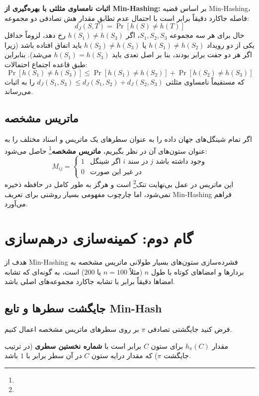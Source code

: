 \textbf{اثبات نامساوی مثلثی با بهره‌گیری از Min-Hashing:}
بر اساس قضیه Min-Hashing، فاصله جاکارد دقیقاً برابر است با احتمال عدم تطابق مقدار هش تصادفی دو مجموعه:
\begin{equation}
d_J(S, T) = \Pr[h(S) \ne h(T)]
\end{equation}
حال برای هر سه مجموعه $S_1, S_2, S_3$، اگر $h(S_1) \ne h(S_3)$ رخ دهد، لزوماً حداقل یکی از دو رویداد $h(S_1) \ne h(S_2)$ یا $h(S_2) \ne h(S_3)$ باید اتفاق افتاده باشد (زیرا اگر هر دو جفت برابر بودند، بنا بر اصل تعدی باید $h(S_1) = h(S_3)$ می‌شد). بنابراین طبق قاعده اجتماع احتمالات:
\begin{equation}
\Pr[h(S_1) \ne h(S_3)] \le \Pr[h(S_1) \ne h(S_2)] + \Pr[h(S_2) \ne h(S_3)]
\end{equation}
که مستقیماً نامساوی مثلثی $d_J(S_1, S_3) \le d_J(S_1, S_2) + d_J(S_2, S_3)$ را به اثبات می‌رساند.

\subsection{ماتریس مشخصه \texorpdfstring{}{(Characteristic Matrix)}}
اگر تمام شینگل‌های جهان داده را به عنوان سطرهای یک ماتریس و اسناد مختلف را به عنوان ستون‌های آن در نظر بگیریم، \textbf{ماتریس مشخصه}\footnote{} حاصل می‌شود:
\begin{equation}
M_{ij} = 
\begin{cases}
1 & \text{اگر شینگل } i \text{ در سند } j \text{ وجود داشته باشد} \\
0 & \text{در غیر این صورت}
\end{cases}
\end{equation}
این ماتریس در عمل بی‌نهایت تنک\footnote{} است و هرگز به طور کامل در حافظه ذخیره نمی‌شود، اما چارچوب مفهومی بسیار روشنی برای تعریف Min-Hashing فراهم می‌آورد.

\section{گام دوم: کمینه‌سازی درهم‌سازی \texorpdfstring{}{(Min-Hashing)}}
هدف از Min-Hashing فشرده‌سازی ستون‌های بسیار طولانی ماتریس مشخصه به بردارها و امضاهای کوتاه با طول $n$ (مثلاً $n = 100$ یا $200$) است، به گونه‌ای که تشابه امضاها دقیقاً برابر با تشابه جاکارد مجموعه‌های اصلی باشد.

\subsection{جایگشت سطرها و تابع Min-Hash}
فرض کنید جایگشتی تصادفی $\pi$ بر روی سطرهای ماتریس مشخصه اعمال کنیم.
\begin{definition}
مقدار $h_\pi(C)$ برای ستون $C$ برابر است با \textbf{شماره نخستین سطری} (در ترتیب جایگشت $\pi$) که مقدار درایه ستون $C$ در آن سطر برابر با $1$ باشد.
\end{definition}

